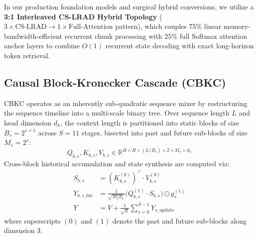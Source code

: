 \documentclass[twocolumn,10pt]{article}
\begin{document}
In our production foundation models and surgical hybrid conversions, we utilize a \textbf{3:1 Interleaved CS-LRAD Hybrid Topology} ($3 \times \text{CS-LRAD} \to 1 \times \text{Full-Attention}$ pattern), which couples $75\%$ linear memory-bandwidth-efficient recurrent chunk processing with $25\%$ full Softmax attention anchor layers to combine $O(1)$ recurrent state decoding with exact long-horizon token retrieval.

\subsection{Causal Block-Kronecker Cascade (CBKC)}
CBKC operates as an inherently sub-quadratic sequence mixer by restructuring the sequence timeline into a multi-scale binary tree. Over sequence length $L$ and head dimension $d_h$, the context length is partitioned into static blocks of size $B_s = 2^{s+1}$ across $S=11$ stages, bisected into past and future sub-blocks of size $M_s = 2^s$:
\begin{equation*}
Q_{b,s}, K_{b,s}, V_{b,s} \in \mathbb{R}^{B \times H \times (L / B_s) \times 2 \times M_s \times d_h}
\end{equation*}
Cross-block historical accumulation and state synthesis are computed via:
\begin{align*}
S_{b,s} &= (K_{b,s}^{(0)})^\top \cdot V_{b,s}^{(0)} \\
Y_{b,s,\text{fut}} &= \frac{1}{\sqrt{M_s d_h}} \Big( Q_{b,s}^{(1)} \cdot S_{b,s} \Big) \odot g_s^{(1)} \\
Y &= V + \frac{1}{\sqrt{S}} \sum_{s=0}^{S-1} Y_{s,\text{update}}
\end{align*}
where superscripts $(0)$ and $(1)$ denote the past and future sub-blocks along dimension 3.
\end{document}
